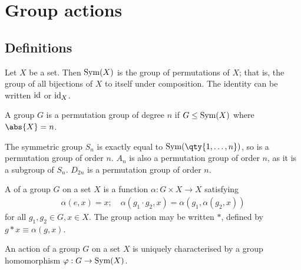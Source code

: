 \section{Group actions}

\subsection{Definitions}
\begin{definition}
	Let $X$ be a set.
	Then $\operatorname{Sym}(X)$ is the group of permutations of $X$; that is, the group of all bijections of $X$ to itself under composition.
	The identity can be written $\operatorname{id}$ or $\operatorname{id}_X$.
\end{definition}

\begin{definition}
	A group $G$ is a permutation group of degree $n$ if $G \leq \operatorname{Sym}(X)$ where $\abs{X} = n$.
\end{definition}

\begin{example}
	The symmetric group $S_n$ is exactly equal to $\Sym(\qty{1, \dots, n})$, so is a permutation group of order $n$.
	$A_n$ is also a permutation group of order $n$, as it is a subgroup of $S_n$.
	$D_{2n}$ is a permutation group of order $n$.
\end{example}

\begin{definition}
	A  of a group $G$ on a set $X$ is a function $\alpha : G \times X \to X$ satisfying
	\begin{align*}
		\alpha(e, x) = x;\quad \alpha(g_1 \cdot g_2, x) = \alpha(g_1, \alpha(g_2, x))
	\end{align*}
	for all $g_1, g_2 \in G, x \in X$.
	The group action may be written $\ast$, defined by $g \ast x \equiv \alpha(g,x)$.
\end{definition}

\begin{proposition}
	An action of a group $G$ on a set $X$ is uniquely characterised by a group homomorphism $\varphi : G \to \operatorname{Sym}(X)$.
\end{proposition}

